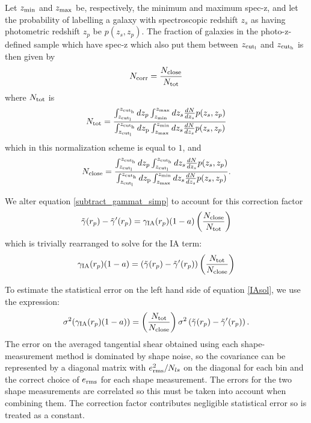 \documentclass[onecolumn,amsmath,aps,fleqn, superscriptaddress]{revtex4}
\begin{document}
Let $z_{\rm min}$ and $z_{\rm max}$ be, respectively, the minimum and maximum spec-z, and let the probability of labelling a galaxy with spectroscopic redshift $z_s$ as having photometric redshift $z_p$ be $p(z_s, z_p)$. The fraction of galaxies in the photo-z-defined sample which have spec-z which also put them between $z_{\rm cut_l}$ and $z_{\rm cut_h}$ is then given by
\begin{equation}
N_{\rm corr} = \frac{N_{\rm close}}{N_{\rm tot}}
\label{Ncorr}
\end{equation}
where $N_{\rm tot}$ is
\begin{equation}
N_{\rm tot} = \frac{\int_{z_{\rm cut_l}}^{z_{\rm cut_h}} dz_p\int_{z_{\rm min}}^{z_{\rm max}} dz_s\frac{dN}{dz_s} p(z_s, z_p)}{\int_{z_{\rm cut_l}}^{z_{\rm cut_h}} d z_{\rm p} \int_{z_{\rm max}}^{z_{\rm min}} dz_s\frac{dN}{dz_s} p(z_s, z_p)}
\label{tot}
\end{equation}
which in this normalization scheme is equal to $1$, and 
\begin{equation}
N_{\rm close} = \frac{\int_{z_{\rm cut_l}}^{z_{\rm cut_h}} dz_p\int_{z_{\rm cut_l}}^{z_{\rm cut_h}} dz_s\frac{dN}{dz_s} p(z_s, z_p)}{\int_{z_{\rm cut_l}}^{z_{\rm cut_h}} d z_{\rm p} \int_{z_{\rm max}}^{z_{\rm min}} dz_s\frac{dN}{dz_s} p(z_s, z_p)}.
\label{close}
\end{equation}

We alter equation \ref{subtract_gammat_simp} to account for this correction factor
\begin{equation}
\tilde{\gamma}(r_p) - \tilde{\gamma}^\prime(r_p) = \gamma_{\rm IA}(r_p)(1-a) \left(\frac{N_{\rm close}}{N_{\rm tot}}\right)
\label{subtract_gammat_fac}
\end{equation}
which is trivially rearranged to solve for the IA term:
\begin{equation}
\gamma_{\rm IA}(r_p)(1-a) = \left(\tilde{\gamma}(r_p) - \tilde{\gamma}^\prime(r_p)\right) \left(\frac{N_{\rm tot}}{N_{\rm close}}\right)
\label{IAsol}
\end{equation}

To estimate the statistical error on the left hand side of equation \ref{IAsol}, we use the expression:
\begin{equation}
\sigma^2(\gamma_{\rm IA}(r_p)(1-a)) = \left(\frac{N_{\rm tot}}{N_{\rm close}}\right) \sigma^2\left(\tilde{\gamma}(r_p) - \tilde{\gamma}^\prime(r_p)\right).
\label{error}
\end{equation}
The error on the averaged tangential shear obtained using each shape-measurement method is dominated by shape noise, so the covariance can be represented by a diagonal matrix with $e_{\rm rms}^2 / N_{ls}$ on the diagonal for each bin and the correct choice of $e_{\rm rms}$ for each shape measurement. The errors for the two shape measurements are correlated so this must be taken into account when combining them. The correction factor contributes negligible statistical error so is treated as a constant.
\end{document}
